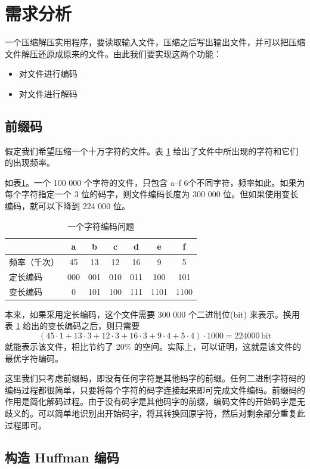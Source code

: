 \section{需求分析}

一个压缩解压实用程序，要读取输入文件，压缩之后写出输出文件，并可以把压缩文件解压还原成原来的文件。由此我们要实现这两个功能：
\begin{itemize}
\item 对文件进行编码
\item 对文件进行解码
\end{itemize}

\subsection{前缀码}

假定我们希望压缩一个十万字符的文件。表 \ref{basetable} 给出了文件中所出现的字符和它们的出现频率。

如表\ref{basetable}。一个 100 000 个字符的文件，只包含 a--f 6个不同字符，频率如此。如果为每个字符指定一个 3 位的码字，则文件编码长度为 300 000 位。但如果使用变长编码，就可以下降到 224 000 位。

\begin{table}[h]
\centering
\caption{\label{basetable}一个字符编码问题}
\begin{tabular}{|l|cccccc|}\hline
 & a & b & c & d & e & f \\\hline
频率（千次） & 45 & 13 & 12 & 16 & 9 & 5 \\
定长编码 & 000 & 001 & 010 & 011 & 100 & 101 \\
变长编码 & 0 & 101 & 100 & 111 & 1101 & 1100 \\\hline
\end{tabular}
\end{table}

本来，如果采用定长编码，这个文件需要 300 000 个二进制位(bit) 来表示。换用表 \ref{basetable} 给出的变长编码之后，则只需要
\[ (45\cdot 1 + 13\cdot 3 + 12\cdot 3 + 16\cdot 3 + 9\cdot 4 + 5\cdot 4)\cdot 1 000 = 224 000\,{\mathrm{bit}} \]
就能表示该文件，相比节约了 20\% 的空间。实际上，可以证明，这就是该文件的最优字符编码。

这里我们只考虑前缀码，即没有任何字符是其他码字的前缀。任何二进制字符码的编码过程都很简单，只要将每个字符的码字连接起来即可完成文件编码。前缀码的作用是简化解码过程。由于没有码字是其他码字的前缀，编码文件的开始码字是无歧义的。可以简单地识别出开始码字，将其转换回原字符，然后对剩余部分重复此过程即可。

\subsection{构造 Huffman 编码}

